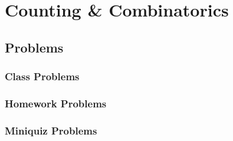 \chapter{Counting \& Combinatorics}
\coursecopyright


\section{Problems}

\subsection{Class Problems}
%
%
%
%
%
%
\clearpage

\subsection{Homework Problems}
%
%
\clearpage

\subsection{Miniquiz Problems}
\clearpage

\endinput